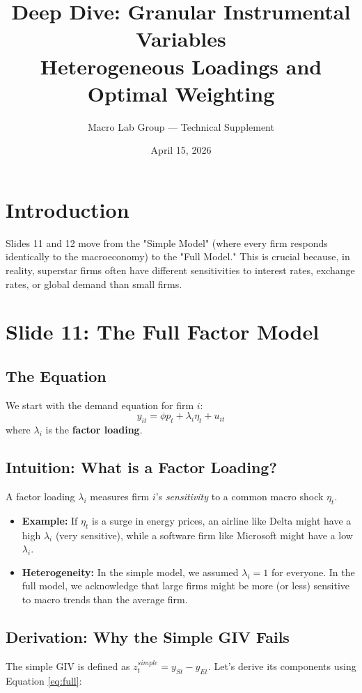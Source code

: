 \documentclass[11pt]{article}
\title{\color{DeepNavy}\huge Deep Dive: Granular Instrumental Variables\\ \large Heterogeneous Loadings and Optimal Weighting}
\author{Macro Lab Group — Technical Supplement}
\date{April 15, 2026}
\begin{document}
\maketitle

\section{Introduction}
Slides 11 and 12 move from the "Simple Model" (where every firm responds identically to the macroeconomy) to the "Full Model." This is crucial because, in reality, superstar firms often have different sensitivities to interest rates, exchange rates, or global demand than small firms.

\section{Slide 11: The Full Factor Model}

\subsection{The Equation}
We start with the demand equation for firm $i$:
\begin{equation}
y_{it} = \phi p_t + \lambda_i \eta_t + u_{it} \label{eq:full}
\end{equation}
where $\lambda_i$ is the \textbf{factor loading}.

\subsection{Intuition: What is a Factor Loading?}
A factor loading $\lambda_i$ measures firm $i$'s \textit{sensitivity} to a common macro shock $\eta_t$. 
\begin{itemize}
    \item \textbf{Example:} If $\eta_t$ is a surge in energy prices, an airline like Delta might have a high $\lambda_i$ (very sensitive), while a software firm like Microsoft might have a low $\lambda_i$.
    \item \textbf{Heterogeneity:} In the simple model, we assumed $\lambda_i = 1$ for everyone. In the full model, we acknowledge that large firms might be more (or less) sensitive to macro trends than the average firm.
\end{itemize}

\subsection{Derivation: Why the Simple GIV Fails}
The simple GIV is defined as $z_t^{simple} = y_{St} - y_{Et}$. Let's derive its components using Equation \ref{eq:full}:
\end{document}
